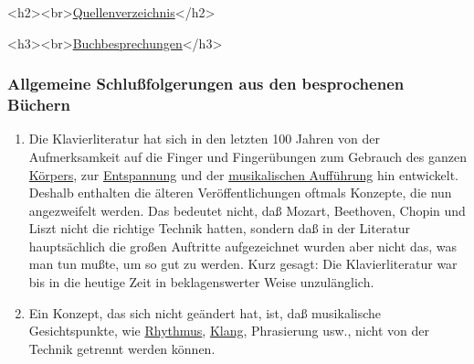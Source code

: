 
\hypertarget{reference}{}

<h2><br>\underline{Quellenverzeichnis}</h2>

<h3><br>\underline{Buchbesprechungen}</h3>

\subsubsection{Allgemeine Schlußfolgerungen aus den besprochenen Büchern}\hypertarget{allgemein}{}

\begin{enumerate}[label={\arabic*.}] 
\item 
Die Klavierliteratur hat sich in den letzten 100 Jahren von der Aufmerksamkeit auf die Finger und Fingerübungen zum Gebrauch des ganzen \hyperlink{c1iii4c}{Körpers}, zur \hyperlink{c1ii14}{Entspannung} und der \hyperlink{c1iii14d}{musikalischen Aufführung} hin entwickelt.
Deshalb enthalten die älteren Veröffentlichungen oftmals Konzepte, die nun angezweifelt werden.
Das bedeutet nicht, daß Mozart, Beethoven, Chopin und Liszt nicht die richtige Technik hatten, sondern daß in der Literatur hauptsächlich die großen Auftritte aufgezeichnet wurden aber nicht das, was man tun mußte, um so gut zu werden.
Kurz gesagt: Die Klavierliteratur war bis in die heutige Zeit in beklagenswerter Weise unzulänglich.

\item Ein Konzept, das sich nicht geändert hat, ist, daß musikalische Gesichtspunkte, wie \hyperlink{c1iii1b}{Rhythmus}, \hyperlink{c1iii1}{Klang}, Phrasierung usw., nicht von der Technik getrennt werden können.


\end{enumerate}
